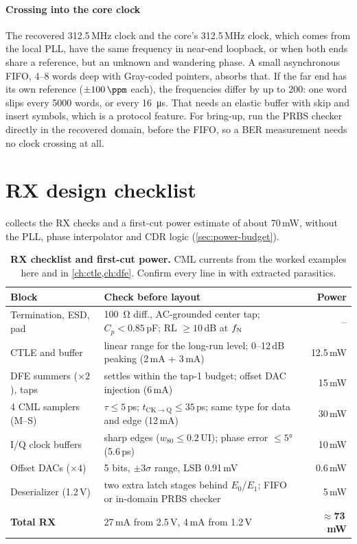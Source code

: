 \paragraph{Crossing into the core clock} The recovered 312.5\,MHz clock and the core's 312.5\,MHz clock, which comes from the local PLL, have the same frequency in near-end loopback, or when both ends share a reference, but an unknown and wandering phase. A small asynchronous FIFO, 4--8 words deep with Gray-coded pointers, absorbs that. If the far end has its own reference ($\pm\qty{100}{\ppm}$ each), the frequencies differ by up to \qty{200}{\ppm}: one word slips every 5000 words, or every \qty{16}{\micro\second}. That needs an elastic buffer with skip and insert symbols, which is a protocol feature. For bring-up, run the PRBS checker directly in the recovered domain, before the FIFO, so a BER measurement needs no clock crossing at all.

\section{RX design checklist}\label{sec:ch10-checklist}

 collects the RX checks and a first-cut power estimate of about 70\,mW, without the PLL, phase interpolator and CDR logic (\cref{sec:power-budget}).

\begin{table}[tbp]
\centering
\caption{\textbf{RX checklist and first-cut power.} CML currents from the worked examples here and in \cref{ch:ctle,ch:dfe}. Confirm every line in  with extracted parasitics.}
\label{tab:ch10-check}
\small
\begin{tabularx}{\linewidth}{@{}l L r@{}}
\toprule
Block & Check before layout & Power\\
\midrule
Termination, ESD, pad & \qty{100}{\ohm} diff., AC-grounded center tap; $C_p<0.85$\,pF; RL $\ge10$\,dB at $f_\mathrm{N}$ & --\\
CTLE and buffer & linear range for the long-run level; 0--12\,dB peaking (2\,mA + 3\,mA) & 12.5\,mW\\
DFE summers ($\times2$), taps & settles within the tap-1 budget; offset DAC injection (6\,mA) & 15\,mW\\
4 CML samplers (M--S) & $\tau\le5$\,ps; $t_\mathrm{CK\to Q}\le35$\,ps; same type for data and edge (12\,mA) & 30\,mW\\
I/Q clock buffers & sharp edges ($w_{80}\le0.2$\,UI); phase error $\le\ang{5}$ (5.6\,ps) & 10\,mW\\
Offset DACs ($\times4$) & 5 bits, $\pm3\sigma$ range, LSB 0.91\,mV & 0.6\,mW\\
Deserializer (1.2\,V) & two extra latch stages behind $E_0$/$E_1$; FIFO or in-domain PRBS checker & 5\,mW\\
\midrule
\textbf{Total RX} & 27\,mA from 2.5\,V, 4\,mA from 1.2\,V & \textbf{$\approx$73\,mW}\\
\bottomrule
\end{tabularx}
\end{table}

